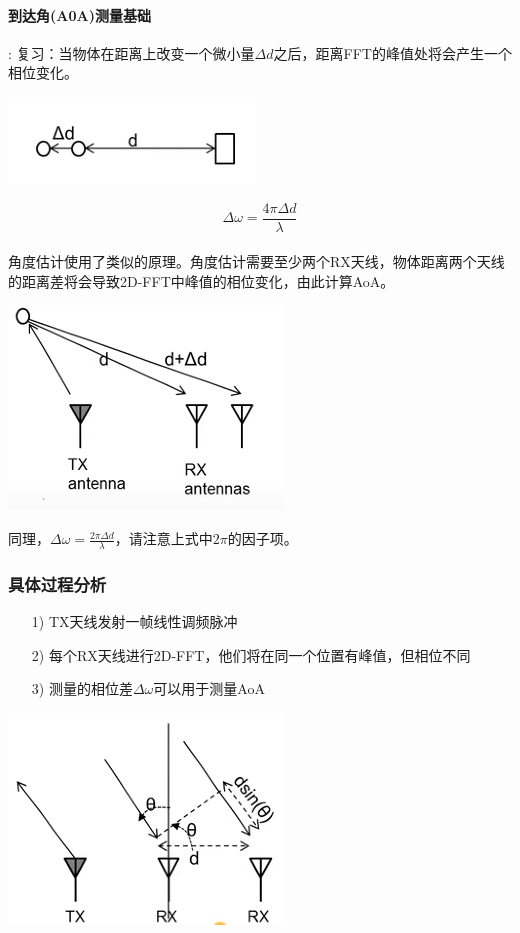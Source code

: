\documentclass[UTF8]{ctexart}
\begin{document}
\paragraph{到达角(A0A)测量基础}:
复习：当物体在距离上改变一个微小量$\Delta d$之后，距离FFT的峰值处将会产生一个相位变化。

{\centering \includegraphics[width = .3\textwidth]{pic/angleest.png}

}

\[\Delta \omega=\frac{4\pi \Delta d}{\lambda}\]
\paragraph{}
角度估计使用了类似的原理。角度估计需要至少两个RX天线，物体距离两个天线的距离差将会导致2D-FFT中峰值的相位变化，由此计算AoA。

{\centering \includegraphics[width = .3\textwidth]{pic/twoRX.png}

}

同理，\(\Delta \omega=\frac{2\pi \Delta d}{\lambda}\)，请注意上式中$2\pi$的因子项。
\subsubsection{具体过程分析}
\begin{enumerate}[1)]
\item [1)]
TX天线发射一帧线性调频脉冲
\item [2)]
每个RX天线进行2D-FFT，他们将在同一个位置有峰值，但相位不同
\item [3)]
测量的相位差$\Delta \omega$可以用于测量AoA
\end{enumerate}
{\centering \includegraphics[width = .3\textwidth]{pic/analysis.png}

}
\end{document}
